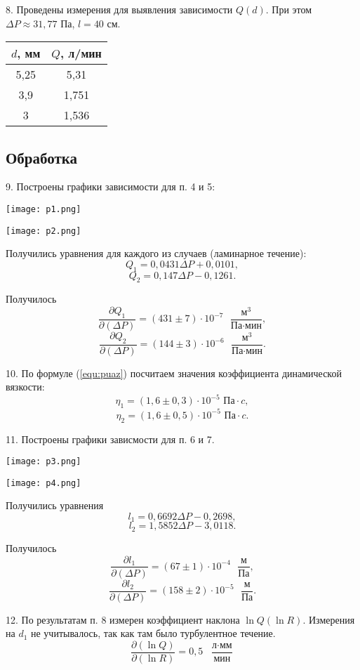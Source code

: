 8. Проведены измерения для выявления зависимости $Q(d)$. При этом $\Delta P \approx 31,77$ Па, $l = 40$ см.
\begin{center}
\begin{tabular}[h]{|c|c|}
    \hline
    $d$, мм & $Q$, л/мин \\
    \hline
    5,25 & 5,31 \\
    \hline
    3,9 & 1,751 \\
    \hline
    3 & 1,536 \\
    \hline
\end{tabular}
\end{center}

\subsection{Обработка}

9. Построены графики зависимости для п. 4 и 5:
\begin{figure*}[h]
    \centering
    \texttt{[image: p1.png]}
\end{figure*}

\begin{figure*}[h]
    \centering
    \texttt{[image: p2.png]}
\end{figure*}

Получились уравнения для каждого из случаев (ламинарное течение):
\[Q_1 = 0,0431\Delta P + 0,0101,\]
\[Q_2 = 0,147\Delta P - 0,1261.\]

Получилось
\[\frac{\partial Q_1}{\partial (\Delta P)} = (431 \pm 7) \cdot 10^{-7} \text{ } \frac{\text{м}^3}{\text{Па}\cdot\text{мин}},\]
\[\frac{\partial Q_2}{\partial (\Delta P)} = (144 \pm 3) \cdot 10^{-6} \text{ } \frac{\text{м}^3}{\text{Па}\cdot\text{мин}}.\]

10. По формуле (\ref*{equ:puaz}) посчитаем значения коэффициента динамической вязкости:
\[\eta_1 = (1,6 \pm 0,3) \cdot 10^{-5} \text{ Па}\cdot c,\]
\[\eta_2 = (1,6 \pm 0,5) \cdot 10^{-5} \text{ Па}\cdot c.\]

11. Построены графики зависмости для п. 6 и 7.
\begin{figure*}[h]
    \centering
    \texttt{[image: p3.png]}
\end{figure*}
\begin{figure*}[h]
    \centering
    \texttt{[image: p4.png]}
\end{figure*}

Получились уравнения
\[l_1 = 0,6692\Delta P - 0,2698,\]
\[l_2 = 1,5852\Delta P - 3,0118.\]

Получилось
\[\frac{\partial l_1}{\partial (\Delta P)} = (67 \pm 1) \cdot 10^{-4} \text{ } \frac{\text{м}}{\text{Па}},\]
\[\frac{\partial l_2}{\partial (\Delta P)} = (158 \pm 2) \cdot 10^{-5} \text{ } \frac{\text{м}}{\text{Па}}.\]

12. По результатам п. 8 измерен коэффициент наклона $\ln Q(\ln R)$. Измерения на $d_1$ не учитывалось, так как там было турбулентное течение.
\[\frac{\partial (\ln Q)}{\partial (\ln R)} = 0,5 \text{ }\frac{\text{л}\cdot\text{мм}}{\text{мин}}\]
